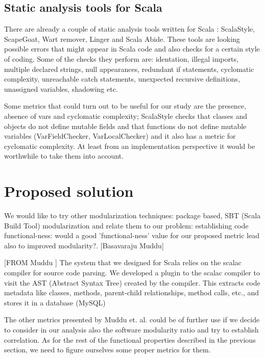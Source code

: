 \documentclass{article}
\begin{document}
\subsection {Static analysis tools for Scala}
There are already a couple of static analysis tools written for Scala : ScalaStyle, ScapeGoat, Wart remover, Linger and Scala Abide. These tools are looking possible errors that might appear in Scala code and also checks for a certain style of coding. Some of the checks they perform are: identation, illegal imports, multiple declared strings, null appearances, redundant if statements, cyclomatic complexity, unreachable catch statements, unexpected recursive definitions, unassigned variables, shadowing etc. \par

Some metrics that could turn out to be useful for our study are  the presence, absence of vars and cyclomatic complexity; ScalaStyle checks that classes and objects do not define mutable fields and that functions do not define mutable variables (VarFieldChecker, VarLocalChecker) \cite{scalastyle} and it also has a metric for cyclomatic complexity. At least from an implementation perspective it would be worthwhile to take them into account.\par

\section{Proposed solution}

We would like to try other modularization techniques: package based, SBT (Scala Build Tool)  modularization and relate them to our problem: establishing code functional-ness: would a good 'functional-ness' value for our proposed metric lead also to improved modularity?. [Basavaraju Muddu]\par

[FROM Muddu ] The system that we designed for Scala relies on the scalac compiler for source code parsing. We developed a plugin to the scalac compiler to visit the AST (Abstract Syntax Tree) created by the compiler. This extracts code metadata like classes, methods, parent-child relationships, method calls, etc., and stores it in a database (MySQL)

The other metrics presented by Muddu et. al. could be of further use if we decide to consider in our analysis also the software modularity ratio and try to establish correlation. As for the rest of the functional properties described in the previous section, we need to figure ourselves some proper metrics for them.
\end{document}
